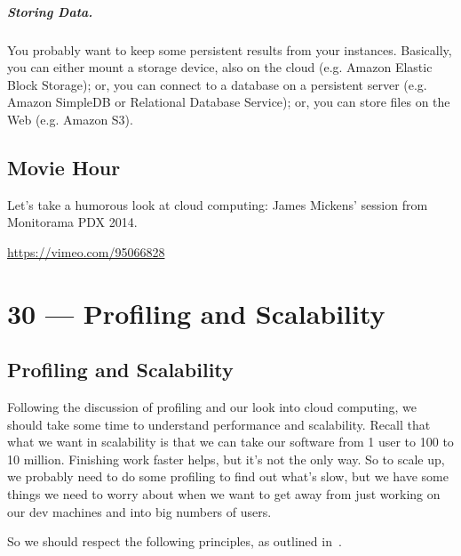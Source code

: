 \documentclass[a4paper]{report}
\begin{document}
\paragraph{Storing Data.} You probably want to keep some persistent results
from your instances. Basically, you can either mount a storage device,
also on the cloud (e.g. Amazon Elastic Block Storage); or, you can
connect to a database on a persistent server (e.g. Amazon SimpleDB or
Relational Database Service); or, you can store files on the Web
(e.g. Amazon S3). 

\section*{Movie Hour}
Let's take a humorous look at cloud computing: James Mickens' session from Monitorama PDX 2014. 

\begin{center}
\url{https://vimeo.com/95066828}
\end{center}









\chapter*{30 --- Profiling and Scalability}


\section*{Profiling and Scalability}

Following the discussion of profiling and our look into cloud computing, we should take some time to understand performance and scalability. Recall that what we want in scalability is that we can take our software from 1 user to 100 to 10 million. Finishing work faster helps, but it's not the only way. So to scale up, we probably need to do some profiling to find out what's slow, but we have some things we need to worry about when we want to get away from just working on our dev machines and into big numbers of users.

So we should respect the following principles, as outlined in~\cite{swps}.
\end{document}
